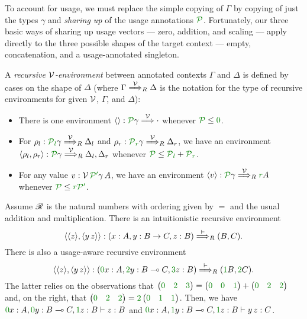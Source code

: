 To account for usage, we must replace the simple copying of $\Gamma$ by
copying of just the types $\gamma$ and \emph{sharing up} of the usage
annotations $\grP$.
Fortunately, our three basic ways of sharing up usage vectors --- zero,
addition, and scaling --- apply directly to the three possible shapes of the
target context --- empty, concatenation, and a usage-annotated singleton.

\begin{definition}\label{def:lr-rec-env}
  A \emph{recursive $\mathcal V$-environment} between annotated contexts $\Gamma$ and
  $\Delta$ is defined by cases on the shape of $\Delta$ (where
  $\Gamma \stackrel{\mathcal V}\Longrightarrow_R \Delta$ is the notation for the
  type of recursive environments for given $\mathcal V$, $\Gamma$, and $\Delta$):
  \begin{itemize}
    \item There is one environment $\alr{} : \grP\gamma \env\V {\cdot}$
      whenever $\grP \leq \gr0$.
    \item For $\rho_l : \grPl\gamma \env\V_R \Delta_l$ and
      $\rho_r : \grPr\gamma \env\V_R \Delta_r$, we have an environment
      $\alr{\rho_l, \rho_r} : \grP\gamma \env\V_R \Delta_l, \Delta_r$ whenever
      $\grP \leq \grPl + \grPr$.
    \item For any value $v : \V\,\grPprime\gamma\,A$, we have an environment
      $\alr{v} : \grP\gamma \env\V_R \gr rA$ whenever
      $\grP \leq \gr r\grPprime$.
  \end{itemize}
\end{definition}

\begin{example}
  Assume $\mathscr R$ is the natural numbers with ordering given by $=$ and the usual
  addition and multiplication.
  There is an intuitionistic recursive environment
  \[
    \alr{\alr{z},\alr{y\,z}} :
    \plr{x : A, y : B \to C, z : B} \env\vdash_R \plr{B, C}.
  \]
  There is also a usage-aware recursive environment
  \[
    \alr{\alr{z},\alr{y\,z}} :
    \plr{\gr0x : A, \gr2y : B \multimap C, \gr3z : B} \env\vdash_R
    \plr{\gr1B, \gr2C}.
  \]
  The latter relies on the observations that
  $\begin{pmatrix} \gr0 & \gr2 & \gr3 \end{pmatrix} =
  \begin{pmatrix} \gr0 & \gr0 & \gr1 \end{pmatrix}
  + \begin{pmatrix} \gr0 & \gr2 & \gr2 \end{pmatrix}$ and, on the right, that
  $\begin{pmatrix} \gr0 & \gr2 & \gr2 \end{pmatrix} =
  \gr2\begin{pmatrix} \gr0 & \gr1 & \gr1 \end{pmatrix}$.
  Then, we have $\gr0x : A, \gr0y : B \multimap C, \gr1z : B \vdash z : B$ and
  $\gr0x : A, \gr1y : B \multimap C, \gr1z : B \vdash y\,z : C$.
\end{example}

